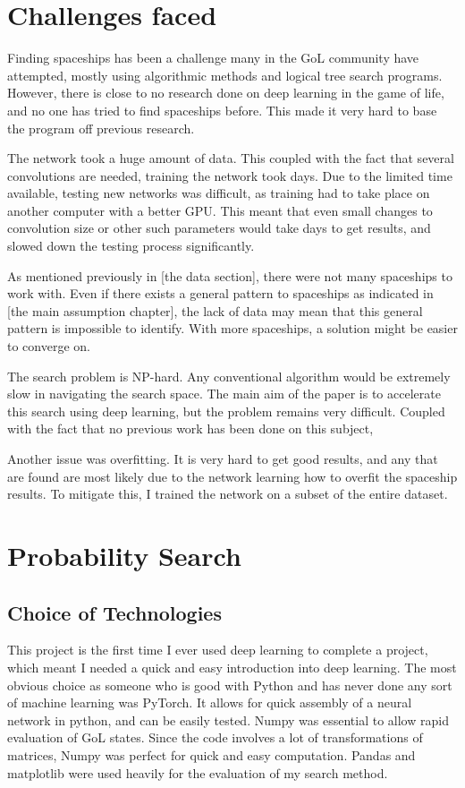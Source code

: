 \documentclass{l4proj}
\begin{document}
\section{Challenges faced}

Finding spaceships has been a challenge many in the GoL community have attempted, mostly using algorithmic methods and logical tree search programs. However, there is close to no research done on deep learning in the game of life, and no one has tried to find spaceships before. This made it very hard to base the program off previous research. 

The network took a huge amount of data. This coupled with the fact that several convolutions are needed, training the network took days. Due to the limited time available, testing new networks was difficult, as training had to take place on another computer with a better GPU. This meant that even small changes to convolution size or other such parameters would take days to get results, and slowed down the testing process significantly.

As mentioned previously in [the data section], there were not many spaceships to work with. Even if there exists a general pattern to spaceships as indicated in [the main assumption chapter], the lack of data may mean that this general pattern is impossible to identify. With more spaceships, a solution might be easier to converge on.

The search problem is NP-hard. Any conventional algorithm would be extremely slow in navigating the search space. The main aim of the paper is to accelerate this search using deep learning, but the problem remains very difficult. Coupled with the fact that no previous work has been done on this subject, 

Another issue was overfitting. It is very hard to get good results, and any that are found are most likely due to the network learning how to overfit the spaceship results. To mitigate this, I trained the network on a subset of the entire dataset.

\section{Probability Search}

\subsection{Choice of Technologies}

This project is the first time I ever used deep learning to complete a project, which meant I needed a quick and easy introduction into deep learning. The most obvious choice as someone who is good with Python and has never done any sort of machine learning was PyTorch. It allows for quick assembly of a neural network in python, and can be easily tested. Numpy was essential to allow rapid evaluation of GoL states. Since the code involves a lot of transformations of matrices, Numpy was perfect for quick and easy computation. Pandas and matplotlib were used heavily for the evaluation of my search method.
\end{document}
